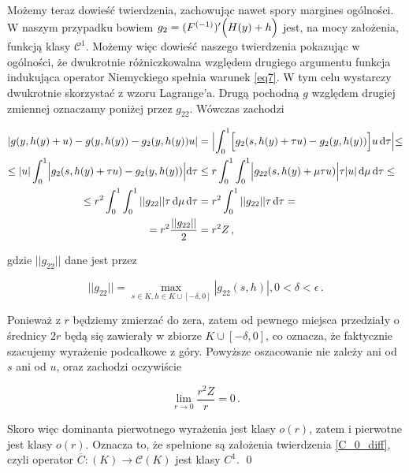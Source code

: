	Możemy teraz dowieść twierdzenia, zachowując nawet spory margines ogólności. W naszym przypadku bowiem $g_2 = (F^{(-1)})' \Bigl( H(y) + h \Bigl)$ jest, na mocy założenia, funkcją klasy $\mathcal{C}^{1}$. Możemy więc dowieść naszego twierdzenia pokazując w ogólności, że dwukrotnie różniczkowalna względem drugiego argumentu funkcja indukująca operator Niemyckiego spełnia warunek \ref{eq7}. W tym celu wystarczy dwukrotnie skorzystać z wzoru Lagrange'a. Drugą pochodną $g$ względem drugiej zmiennej oznaczamy poniżej przez $g_{22}$. Wówczas zachodzi

\begin{align*}
\begin{split}
|g(y, h(y)+u) - g(y,h(y)) - g_2 (y,h(y))u | &= 
\Bigl|\int _0^{1} \Bigl[ g_2(s, h(y)+ \tau u)- g_2(y,h(y))\Bigl]u\, \mathrm{d} \tau \Bigl| \leq\\
\leq |u| \int _0^{1} \Bigl| g_2(s, h(y)+ \tau u)- g_2(y,h(y))\Bigl| \mathrm{d} \tau &\leq 
r \int _0^{1}  \int _0^{1} \Bigl| g_{22}(s, h(y)+ \mu \tau u)\Bigl| \tau | u | \,\mathrm{d}\mu \, \mathrm{d} \tau \leq\\
\leq r^2 \int _0^{1}  \int _0^{1} || g_{22} || \tau \, \mathrm{d}\mu \, \mathrm{d} \tau &= 
r^2 \int _0^{1}  || g_{22} || \tau \, \mathrm{d}\tau  = \\
= r^2 \frac{|| g_{22} ||}{2} &= r^2 Z \,,
\end{split}	
\end{align*}	

gdzie $||g_{22} ||$ dane jest przez

\begin{equation*}
	||g_{22} || = \underset{s \in K, h \in K \cup [-\delta,0]}{\max} |g_{22}(s,h)|, 0 < \delta < \epsilon \,.
\end{equation*}

Ponieważ z $r$ będziemy zmierzać do zera, zatem od pewnego miejsca przedziały o średnicy $2r$ będą się zawierały w zbiorze $K \cup [-\delta,0]$, co oznacza, że faktycznie szacujemy wyrażenie podcałkowe z góry. Powyższe oszacowanie nie zależy ani od $s$ ani od $u$, oraz zachodzi oczywiście

\begin{equation*}
	\underset{r \rightarrow 0}{\lim} \frac{r^2 Z}{r} = 0\,.
\end{equation*}

Skoro więc dominanta pierwotnego wyrażenia jest klasy $o(r)$, zatem i pierwotne jest klasy $o(r)$. Oznacza to, że spełnione są założenia twierdzenia \ref{C_0_diff}, czyli operator $\overline{C}: (K) \rightarrow \mathcal{C}(K)$ jest klasy $C^1$.
\qed
\newline




